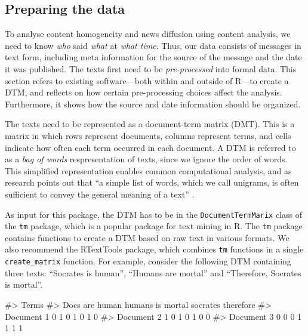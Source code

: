 \subsection{Preparing the data}\label{preparing-the-data}

To analyse content homogeneity and news diffusion using content
analysis, we need to know \emph{who} said \emph{what} at \emph{what
time}. Thus, our data consists of messages in text form, including meta
information for the source of the message and the date it was published.
The texts first need to be \emph{pre-processed} into formal data. This
section refers to existing software---both within and outside of R---to
create a DTM, and reflects on how certain pre-processing choices affect
the analysis. Furthermore, it shows how the source and date information
should be organized.

The texts need to be represented as a document-term matrix (DMT). This
is a matrix in which rows represent documents, columns represent terms,
and cells indicate how often each term occurred in each document. A DTM
is referred to as a \emph{bag of words} respresentation of texts, since
we ignore the order of words. This simplified representation enables
common computational analysis, and as research points out that ``a
simple list of words, which we call unigrams, is often sufficient to
convey the general meaning of a text'' \citep[6]{grimmer13}.

As input for this package, the DTM has to be in the
\texttt{DocumentTermMarix} class of the \texttt{tm} package, which is a
popular package for text mining in R. The \texttt{tm} package contains
functions to create a DTM based on raw text in various formats. We also
recommend the RTextTools package, which combines \texttt{tm} functions
in a single \texttt{create\_matrix} function. For example, consider the
following DTM containing three texts: ``Socrates is human'', ``Humans
are mortal'' and ``Therefore, Socrates is mortal''.

\begin{Schunk}
\begin{Soutput}
#>             Terms
#> Docs         are human humans is mortal socrates therefore
#>   Document 1   0     1      0  1      0        1         0
#>   Document 2   1     0      1  0      1        0         0
#>   Document 3   0     0      0  1      1        1         1
\end{Soutput}
\end{Schunk}

